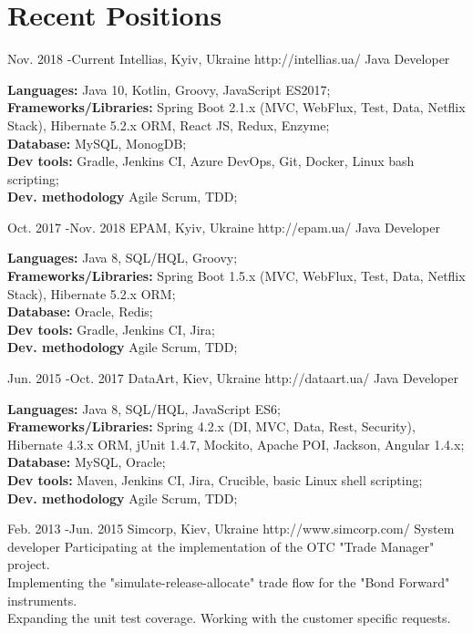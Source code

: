 \documentclass[10pt]{article} %
\begin{document}
\section{Recent Positions}
\job
{Nov. 2018 -}{Current}
{Intellias, Kyiv, Ukraine}
{http://intellias.ua/}
{Java Developer}
{

\rule{0mm}{5mm}\textbf{Languages:}  Java 10, Kotlin, Groovy, JavaScript ES2017;
\\  \textbf{Frameworks/Libraries:}  Spring Boot 2.1.x (MVC, WebFlux, Test, Data, Netflix Stack), Hibernate 5.2.x ORM, React JS, Redux, Enzyme;
\\ \textbf{Database:}  MySQL, MonogDB;
\\  \textbf{Dev tools:} Gradle, Jenkins CI, Azure DevOps, Git, Docker, Linux bash scripting;
\\  \textbf{Dev. methodology} Agile Scrum, TDD;
 }
 
\job
{Oct. 2017 -}{Nov. 2018}
{EPAM, Kyiv, Ukraine}
{http://epam.ua/}
{Java Developer}
{

\rule{0mm}{5mm}\textbf{Languages:}  Java 8, SQL/HQL, Groovy;
\\  \textbf{Frameworks/Libraries:}  Spring Boot 1.5.x (MVC, WebFlux, Test, Data, Netflix Stack), Hibernate 5.2.x ORM;
\\ \textbf{Database:}  Oracle, Redis;
\\  \textbf{Dev tools:} Gradle, Jenkins CI, Jira;
\\  \textbf{Dev. methodology} Agile Scrum, TDD;
 }

\job
{Jun. 2015 -}{Oct. 2017}
{DataArt, Kiev, Ukraine}
{http://dataart.ua/}
{Java Developer}
{

\rule{0mm}{5mm}\textbf{Languages:}  Java 8, SQL/HQL, JavaScript ES6;
\\  \textbf{Frameworks/Libraries:}  Spring 4.2.x (DI, MVC, Data, Rest, Security), Hibernate 4.3.x ORM, jUnit 1.4.7, Mockito, Apache POI, Jackson, Angular 1.4.x;
\\ \textbf{Database:}  MySQL, Oracle;
\\  \textbf{Dev tools:} Maven, Jenkins CI, Jira, Crucible, basic Linux shell scripting;
\\  \textbf{Dev. methodology} Agile Scrum, TDD;
 }

\job
{Feb. 2013 -}{Jun. 2015}
{Simcorp, Kiev, Ukraine}
{http://www.simcorp.com/}
{System developer}
{Participating at the implementation of the OTC "Trade Manager" project. 
\\Implementing the "simulate-release-allocate" trade flow for the "Bond Forward" instruments. 
\\Expanding the unit test coverage. Working with the customer specific requests. \\
 }
\end{document}
